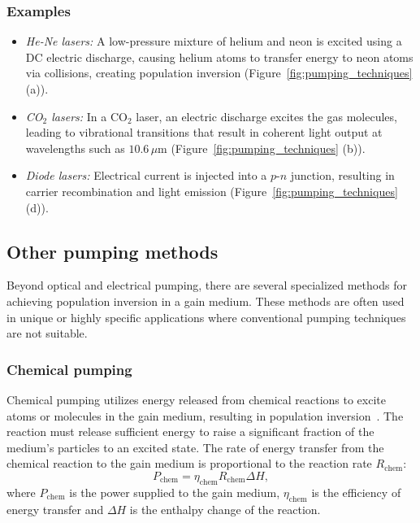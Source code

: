 \documentclass[prl,twocolumn]{revtex4-1}
\begin{document}
\subsubsection{\textbf{Examples}}
\begin{itemize}
  \item \textit{He-Ne lasers:} A low-pressure mixture of helium and neon is excited using a DC electric discharge, causing helium atoms to transfer energy to neon atoms via collisions, creating population inversion (Figure~\ref{fig:pumping_techniques} (a)).
  \item \textit{CO$_2$ lasers:} In a CO$_2$ laser, an electric discharge excites the gas molecules, leading to vibrational transitions that result in coherent light output at wavelengths such as $10.6 \, \mu\text{m}$ (Figure~\ref{fig:pumping_techniques} (b)).
  \item \textit{Diode lasers:} Electrical current is injected into a $p$-$n$ junction, resulting in carrier recombination and light emission (Figure~\ref{fig:pumping_techniques} (d)).
\end{itemize}

\subsection{Other pumping methods}
Beyond optical and electrical pumping, there are several specialized methods for achieving population inversion in a gain medium. These methods are often used in unique or highly specific applications where conventional pumping techniques are not suitable.

\subsubsection{\textbf{Chemical pumping}}
Chemical pumping utilizes energy released from chemical reactions to excite atoms or molecules in the gain medium, resulting in population inversion~\cite{chemical_pumping}. The reaction must release sufficient energy to raise a significant fraction of the medium's particles to an excited state. The rate of energy transfer from the chemical reaction to the gain medium is proportional to the reaction rate $R_{\text{chem}}$:
%
\begin{equation}
    P_{\text{chem}} = \eta_{\text{chem}} R_{\text{chem}} \Delta H,
\end{equation}
where $P_{\text{chem}}$ is the power supplied to the gain medium, $\eta_{\text{chem}}$ is the efficiency of energy transfer and $\Delta H$ is the enthalpy change of the reaction.
\end{document}
